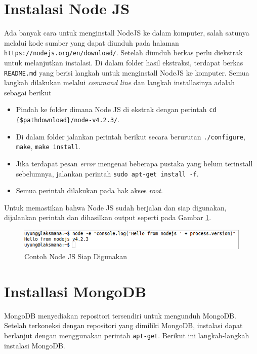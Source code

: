 \documentclass{ta-its}
\begin{document}
		\section{Instalasi Node JS}
			Ada banyak cara untuk menginstall NodeJS ke dalam komputer, salah satunya melalui kode sumber yang dapat diunduh pada halaman \texttt{https://nodejs.org/en/download/}. Setelah diunduh berkas perlu diekstrak untuk melanjutkan instalasi. Di dalam folder hasil ekstraksi, terdapat berkas \texttt{README.md} yang berisi langkah untuk menginstall NodeJS ke komputer. Semua langkah dilakukan melalui \textit{command line} dan langkah installasinya adalah sebagai berikut
			
			\begin{itemize}
				\item Pindah ke folder dimana Node JS di ekstrak dengan perintah \texttt{cd \{\$pathdownload\}/node-v4.2.3/}.
				\item Di dalam folder jalankan perintah berikut secara berurutan \texttt{./configure}, \texttt{make}, \texttt{make install}.
				\item Jika terdapat pesan \textit{error} mengenai beberapa pustaka yang belum terinstall sebelumnya, jalankan perintah \texttt{sudo apt-get install -f}.
				\item Semua perintah dilakukan pada hak akses \textit{root}.
			\end{itemize}
			
			Untuk memastikan bahwa Node JS sudah berjalan dan siap digunakan, dijalankan perintah dan dihasilkan output seperti pada Gambar \ref{gambarCekNodeJS}.
			
			\begin{figure}[h] %
				\centering
				\includegraphics[width=\linewidth]{contoh_img/ceknodejs}
				\caption{Contoh Node JS Siap Digunakan}
				\label{gambarCekNodeJS}
			\end{figure}
		
		\section{Installasi MongoDB}
			MongoDB menyediakan repositori tersendiri untuk mengunduh MongoDB. Setelah terkoneksi dengan repositori yang dimiliki MongoDB, instalasi dapat berlanjut dengan menggunakan perintah \texttt{apt-get}. Berikut ini langkah-langkah instalasi MongoDB.			
			
\end{document}
